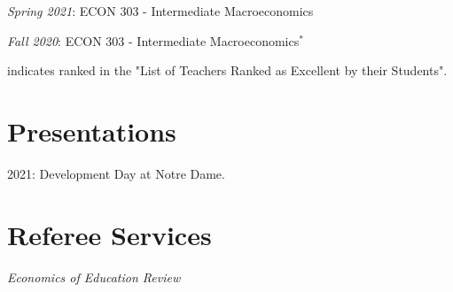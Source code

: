 \documentclass[letterpaper,11pt]{article}
\begin{document}
\begin{adjustwidth}{9mm}{0mm}
  \textit{Spring 2021}: ECON 303 - Intermediate Macroeconomics
\end{adjustwidth}

\begin{adjustwidth}{9mm}{0mm}
  \textit{Fall 2020}: ECON 303 - Intermediate Macroeconomics$^*$
\end{adjustwidth}

\vspace{3mm}

\begin{adjustwidth}{3mm}{0mm}
  \scriptsize * indicates ranked in the "List of Teachers Ranked as Excellent by their Students".
\end{adjustwidth}


\section{Presentations}
\begin{adjustwidth}{3mm}{0mm}
  2021: Development Day at Notre Dame.
\end{adjustwidth}

\section{Referee Services}
\begin{adjustwidth}{3mm}{0mm}
\textit{Economics of Education Review}
\end{adjustwidth}
\end{document}
